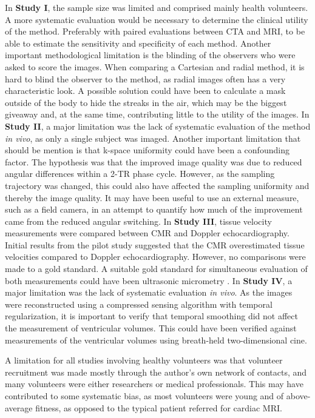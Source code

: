In \textbf{Study I}, the sample size was limited and comprised mainly health volunteers. A more systematic evaluation would be necessary to determine the clinical utility of the method. Preferably with paired evaluations between CTA and MRI, to be able to estimate the sensitivity and specificity of each method. Another important methodological limitation is the blinding of the observers who were asked to score the images. When comparing a Cartesian and radial method, it is hard to blind the observer to the method, as radial images often has a very characteristic look. A possible solution could have been to calculate a mask outside of the body to hide the streaks in the air, which may be the biggest giveaway and, at the same time, contributing little to the utility of the images.
In \textbf{Study II}, a major limitation was the lack of systematic evaluation of the method \emph{in vivo}, as only a single subject was imaged. Another important limitation that should be mention is that k-space uniformity could have been a confounding factor. The hypothesis was that the improved image quality was due to reduced angular differences within a 2-TR phase cycle. However, as the sampling trajectory was changed, this could also have affected the sampling uniformity and thereby the image quality. It may have been useful to use an external measure, such as a field camera, in an attempt to quantify how much of the improvement came from the reduced angular switching.
In \textbf{Study III}, tissue velocity measurements were compared between CMR and Doppler echocardiography. Initial results from the pilot study suggested that the CMR overestimated tissue velocities compared to Doppler echocardiography. However, no comparisons were made to a gold standard. A suitable gold standard for simultaneous evaluation of both measurements could have been ultrasonic micrometry \cite{Kokubo1995}.
In \textbf{Study IV}, a major limitation was the lack of systematic evaluation \emph{in vivo}. As the images were reconstructed using a compressed sensing algorithm with temporal regularization, it is important to verify that temporal smoothing did not affect the measurement of ventricular volumes. This could have been verified against measurements of the ventricular volumes using breath-held two-dimensional cine.

A limitation for all studies involving healthy volunteers was that volunteer recruitment was made mostly through the author's own network of contacts, and many volunteers were either researchers or medical professionals. This may have contributed to some systematic bias, as most volunteers were young and of above-average fitness, as opposed to the typical patient referred for cardiac MRI.

